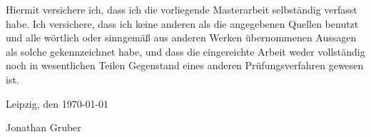\clearpage
{}

Hiermit versichere ich, dass ich die vorliegende Masterarbeit selbständig verfasst habe. Ich versichere, dass ich keine anderen als die angegebenen Quellen benutzt und alle wörtlich oder sinngemäß aus anderen Werken übernommenen Aussagen als solche gekennzeichnet habe, und dass die eingereichte Arbeit weder vollständig noch in wesentlichen Teilen Gegenstand eines anderen Prüfungsverfahren gewesen ist.

Leipzig, den \today
\vspace{0.5cm}

\makebox[4cm]{\hrulefill}
\newline\vspace{1cm}
Jonathan Gruber
